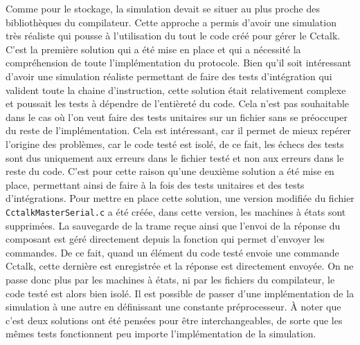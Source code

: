 \documentclass[a4paper]{article}
\begin{document}
Comme pour le stockage, la simulation devait se situer au plus proche des
bibliothèques du compilateur. Cette approche a permis d'avoir une simulation
très réaliste qui pousse à l'utilisation du tout le code créé pour gérer le
Cctalk. C'est la première solution qui a été mise en place et qui a nécessité la
compréhension de toute l'implémentation du protocole. Bien qu'il soit
intéressant d'avoir une simulation réaliste permettant de faire des tests
d'intégration qui valident toute la chaine d'instruction, cette solution était
relativement complexe et poussait les tests à dépendre de l'entièreté du code.
Cela n'est pas souhaitable dans le cas où l'on veut faire des tests unitaires
sur un fichier sans se préoccuper du reste de l'implémentation. Cela est
intéressant, car il permet de mieux repérer l'origine des problèmes, car le code
testé est isolé, de ce fait, les échecs des tests sont dus uniquement aux
erreurs dans le fichier testé et non aux erreurs dans le reste du code. C'est
pour cette raison qu'une deuxième solution a été mise en place, permettant ainsi
de faire à la fois des tests unitaires et des tests d'intégrations. Pour mettre
en place cette solution, une version modifiée du fichier
\verb|CctalkMasterSerial.c| a été créée, dans cette version, les machines à états
sont supprimées. La sauvegarde de la trame reçue ainsi que l'envoi de la réponse
du composant est géré directement depuis la fonction qui permet d'envoyer les
commandes. De ce fait, quand un élément du code testé envoie une commande
Cctalk, cette dernière est enregistrée et la réponse est directement envoyée. On
ne passe donc plus par les machines à états, ni par les fichiers du compilateur,
le code testé est alors bien isolé. Il est possible de passer d'une
implémentation de la simulation à une autre en définissant une constante
préprocesseur. À noter que c'est deux solutions ont été pensées pour être
interchangeables, de sorte que les mêmes tests fonctionnent peu importe
l'implémentation de la simulation.
\end{document}
